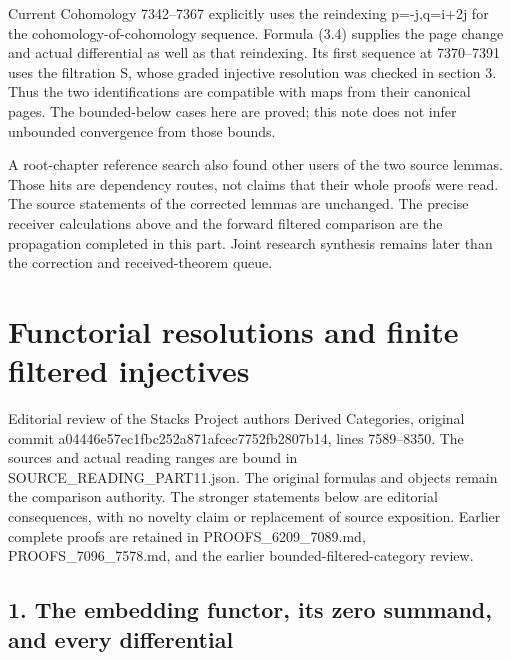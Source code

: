 \documentclass[11pt]{article}
\begin{document}
Current Cohomology 7342–\allowbreak{}7367 explicitly uses the reindexing p\allowbreak{}=-j,\allowbreak{}q\allowbreak{}=i\allowbreak{}+2j for the cohomology-of-cohomology sequence. Formula (3.4)\allowbreak{} supplies the page change and actual differential as well as that reindexing. Its first sequence at 7370–\allowbreak{}7391 uses the filtration S,\allowbreak{} whose graded injective resolution was checked in section 3. Thus the two identifications are compatible with maps from their canonical pages. The bounded-below cases here are proved; this note does not infer unbounded convergence from those bounds.

A root-chapter reference search also found other users of the two source lemmas. Those hits are dependency routes,\allowbreak{} not claims that their whole proofs were read. The source statements of the corrected lemmas are unchanged. The precise receiver calculations above and the forward filtered comparison are the propagation completed in this part. Joint research synthesis remains later than the correction and received-theorem queue.
\clearpage
\section{Functorial resolutions and finite filtered injectives}\label{proofs-7589-8350-functorial-resolutions-and-finite-filtered-injectives}

Editorial review of the Stacks Project authors\textquotesingle{} Derived Categories,\allowbreak{} original commit a04446e5\allowbreak{}7ec1fbc2\allowbreak{}52a871af\allowbreak{}cec7752f\allowbreak{}b2807b14, lines 7589–\allowbreak{}8350. The sources and actual reading ranges are bound in SOURCE\_\allowbreak{}READING\_\allowbreak{}PART11.json. The original formulas and objects remain the comparison authority. The stronger statements below are editorial consequences,\allowbreak{} with no novelty claim or replacement of source exposition. Earlier complete proofs are retained in PROOFS\_\allowbreak{}6209\_\allowbreak{}7089.md,\allowbreak{} PROOFS\_\allowbreak{}7096\_\allowbreak{}7578.md,\allowbreak{} and the earlier bounded-filtered-category review.

\subsection{\texorpdfstring{1. The embedding functor,\allowbreak{} its zero summand,\allowbreak{} and every differential}{1. The embedding  its zero  and every differential}}\label{proofs-7589-8350-the-embedding-functor-its-zero-summand-and-every-differential}
\end{document}
